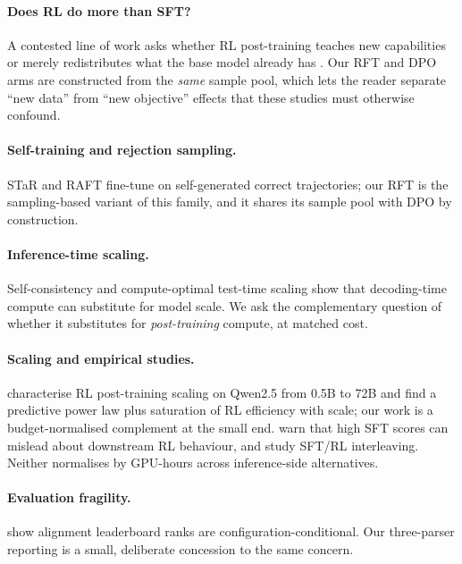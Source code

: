 \documentclass[11pt]{article}
\providecommand{\citet}[1]{\cite{#1}}
\begin{document}
\paragraph{Does RL do more than SFT?}
A contested line of work asks whether RL post-training teaches new capabilities
or merely redistributes what the base model already has
\cite{sftmemorizes2025,rlreasoning2025}. Our RFT and DPO arms are constructed
from the \emph{same} sample pool, which lets the reader separate ``new data''
from ``new objective'' effects that these studies must otherwise confound.

\paragraph{Self-training and rejection sampling.}
STaR \cite{zelikman2022star} and RAFT \cite{dong2023raft} fine-tune on
self-generated correct trajectories; our RFT is the sampling-based variant of
this family, and it shares its sample pool with DPO by construction.

\paragraph{Inference-time scaling.}
Self-consistency \cite{wang2022selfconsistency} and compute-optimal test-time
scaling \cite{snell2024scaling} show that decoding-time compute can substitute
for model scale. We ask the complementary question of whether it substitutes
for \emph{post-training} compute, at matched cost.

\paragraph{Scaling and empirical studies.}
\citet{tan2026scaling} characterise RL post-training scaling on Qwen2.5 from
0.5B to 72B and find a predictive power law plus saturation of RL efficiency
with scale; our work is a budget-normalised complement at the small end.
\citet{quagmires2025} warn that high SFT scores can mislead about downstream RL
behaviour, and \citet{interleaving2025} study SFT/RL interleaving. Neither
normalises by GPU-hours across inference-side alternatives.

\paragraph{Evaluation fragility.}
\citet{safetyrepro2026} show alignment leaderboard ranks are
configuration-conditional. Our three-parser reporting is a small, deliberate
concession to the same concern.
\end{document}
